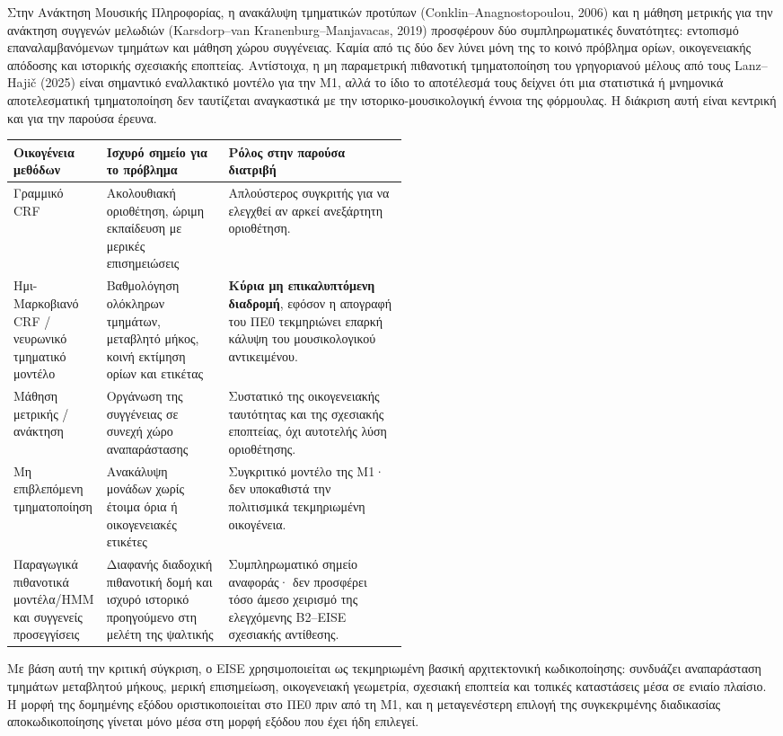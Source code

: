 \documentclass[11pt,a4paper]{article}
\begin{document}
Στην Ανάκτηση Μουσικής Πληροφορίας, η ανακάλυψη τμηματικών προτύπων (Conklin--Anagnostopoulou, 2006) και η μάθηση μετρικής για την ανάκτηση συγγενών μελωδιών (Karsdorp--van Kranenburg--Manjavacas, 2019) προσφέρουν δύο συμπληρωματικές δυνατότητες: εντοπισμό επαναλαμβανόμενων τμημάτων και μάθηση χώρου συγγένειας. Καμία από τις δύο δεν λύνει μόνη της το κοινό πρόβλημα ορίων, οικογενειακής απόδοσης και ιστορικής σχεσιακής εποπτείας. Αντίστοιχα, η μη παραμετρική πιθανοτική τμηματοποίηση του γρηγοριανού μέλους από τους Lanz--Hajič (2025) είναι σημαντικό εναλλακτικό μοντέλο για την M1, αλλά το ίδιο το αποτέλεσμά τους δείχνει ότι μια στατιστικά ή μνημονικά αποτελεσματική τμηματοποίηση δεν ταυτίζεται αναγκαστικά με την ιστορικο-μουσικολογική έννοια της φόρμουλας. Η διάκριση αυτή είναι κεντρική και για την παρούσα έρευνα.

\begin{xltabular}{0.98\linewidth}{@{}p{0.20\linewidth}p{0.31\linewidth}Y@{}}
\toprule
\textbf{Οικογένεια μεθόδων} & \textbf{Ισχυρό σημείο για το πρόβλημα} & \textbf{Ρόλος στην παρούσα διατριβή}\\
\midrule
Γραμμικό CRF & Ακολουθιακή οριοθέτηση, ώριμη εκπαίδευση με μερικές επισημειώσεις & Απλούστερος συγκριτής για να ελεγχθεί αν αρκεί ανεξάρτητη οριοθέτηση.\\
\midrule
Ημι-Μαρκοβιανό CRF / νευρωνικό τμηματικό μοντέλο & Βαθμολόγηση ολόκληρων τμημάτων, μεταβλητό μήκος, κοινή εκτίμηση ορίων και ετικέτας & \textbf{Κύρια μη επικαλυπτόμενη διαδρομή}, εφόσον η απογραφή του ΠΕ0 τεκμηριώνει επαρκή κάλυψη του μουσικολογικού αντικειμένου.\\
\midrule
Μάθηση μετρικής / ανάκτηση & Οργάνωση της συγγένειας σε συνεχή χώρο αναπαράστασης & Συστατικό της οικογενειακής ταυτότητας και της σχεσιακής εποπτείας, όχι αυτοτελής λύση οριοθέτησης.\\
\midrule
Μη επιβλεπόμενη τμηματοποίηση & Ανακάλυψη μονάδων χωρίς έτοιμα όρια ή οικογενειακές ετικέτες & Συγκριτικό μοντέλο της M1· δεν υποκαθιστά την πολιτισμικά τεκμηριωμένη οικογένεια.\\
\midrule
Παραγωγικά πιθανοτικά μοντέλα/HMM και συγγενείς προσεγγίσεις & Διαφανής διαδοχική πιθανοτική δομή και ισχυρό ιστορικό προηγούμενο στη μελέτη της ψαλτικής & Συμπληρωματικό σημείο αναφοράς· δεν προσφέρει τόσο άμεσο χειρισμό της ελεγχόμενης B2--EISE σχεσιακής αντίθεσης.\\
\bottomrule
\end{xltabular}

Με βάση αυτή την κριτική σύγκριση, ο EISE χρησιμοποιείται ως τεκμηριωμένη βασική αρχιτεκτονική κωδικοποίησης: συνδυάζει αναπαράσταση τμημάτων μεταβλητού μήκους, μερική επισημείωση, οικογενειακή γεωμετρία, σχεσιακή εποπτεία και τοπικές καταστάσεις μέσα σε ενιαίο πλαίσιο. Η μορφή της δομημένης εξόδου οριστικοποιείται στο ΠΕ0 πριν από τη M1, και η μεταγενέστερη επιλογή της συγκεκριμένης διαδικασίας αποκωδικοποίησης γίνεται μόνο μέσα στη μορφή εξόδου που έχει ήδη επιλεγεί.
\end{document}
